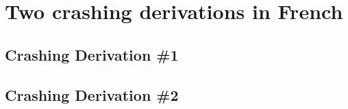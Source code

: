 \documentclass[MilwayThesis]{subfiles}
\begin{document}
\section{Two crashing derivations in French}

\subsection{Crashing Derivation \#1}

\subsection{Crashing Derivation \#2}
\end{document}
